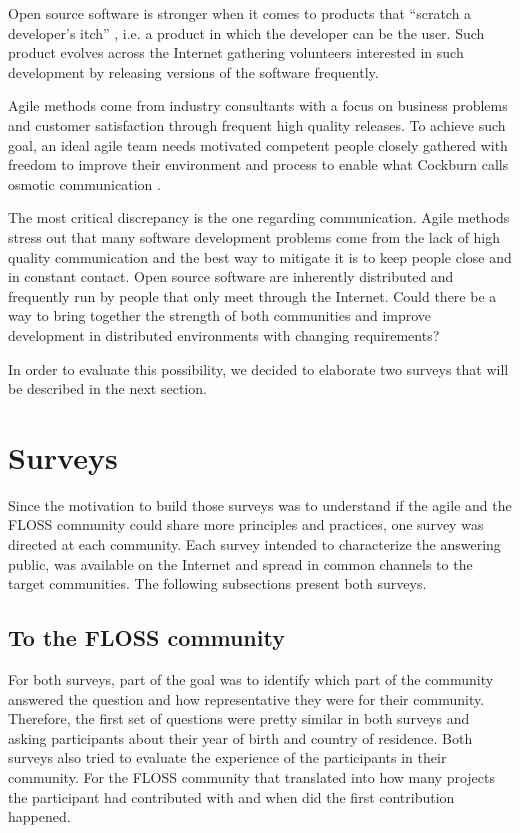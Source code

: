 \documentclass[lnbip]{svmultln}
\begin{document}
Open source software is stronger when it comes to products that
``scratch a developer's itch'' \cite{fitzgerald2000}, i.e. a product
in which the developer can be the user. Such product evolves across
the Internet gathering volunteers interested in such development by
releasing versions of the software frequently.

Agile methods come from industry consultants with a focus on business
problems and customer satisfaction through frequent high quality
releases. To achieve such goal, an ideal agile team needs motivated
competent people closely gathered with freedom to improve their
environment and process to enable what Cockburn calls osmotic
communication \cite{cockburn2004}.

The most critical discrepancy is the one regarding
communication. Agile methods stress out that many software development
problems come from the lack of high quality communication and the best
way to mitigate it is to keep people close and in constant
contact. Open source software are inherently distributed and
frequently run by people that only meet through the Internet. Could
there be a way to bring together the strength of both communities and
improve development in distributed environments with changing
requirements?

In order to evaluate this possibility, we decided to elaborate two
surveys that will be described in the next section.

\section{Surveys}
\label{sec:surveys}

Since the motivation to build those surveys was to understand if the
agile and the FLOSS community could share more principles and
practices, one survey was directed at each community.  Each survey
intended to characterize the answering public, was available on the
Internet and spread in common channels to the target communities. The
following subsections present both surveys.

\subsection{To the FLOSS community}
\label{subsec:floss-survey}

For both surveys, part of the goal was to identify which part of the
community answered the question and how representative they were for
their community. Therefore, the first set of questions were pretty
similar in both surveys and asking participants about their year of
birth and country of residence. Both surveys also tried to evaluate
the experience of the participants in their community. For the FLOSS
community that translated into how many projects the participant had
contributed with and when did the first contribution happened.
\end{document}
